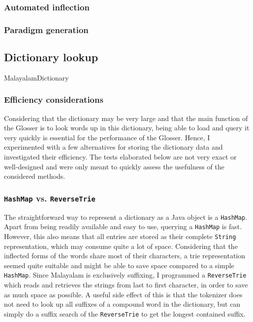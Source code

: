\documentclass[a4paper]{article}
\newcommand{\typ}[1]{\texttt{#1}}
\begin{document}
\subsubsection{Automated inflection}

\subsubsection{Paradigm generation}\label{pargen}


\subsection{Dictionary lookup}

MalayalamDictionary

\subsubsection{Efficiency considerations}

Considering that the dictionary may be very large and that the main function of the Glosser is to look words up in this dictionary, being able to load and query it very quickly is essential for the performance of the Glosser. Hence, I experimented with a few alternatives for storing the dictionary data and investigated their efficiency. The tests elaborated below are not very exact or well-designed and were only meant to quickly assess the usefulness of the considered methods.

\subsubsection*{\typ{HashMap} vs. \typ{ReverseTrie}}

The straightforward way to represent a dictionary as a Java object is a \typ{HashMap}. Apart from being readily available and easy to use, querying a \typ{HashMap} is fast. However, this also means that all entries are stored as their complete \typ{String} representation, which may consume quite a lot of space. Considering that the inflected forms of the words share most of their characters, a trie representation seemed quite suitable and might be able to save space compared to a simple \typ{HashMap}. Since Malayalam is exclusively suffixing, I programmed a \typ{ReverseTrie} which reads and retrieves the strings from last to first character, in order to save as much space as possible. A useful side effect of this is that the tokenizer does not need to look up all suffixes of a compound word in the dictionary, but can simply do a suffix search of the \typ{ReverseTrie} to get the longest contained suffix.
\end{document}
